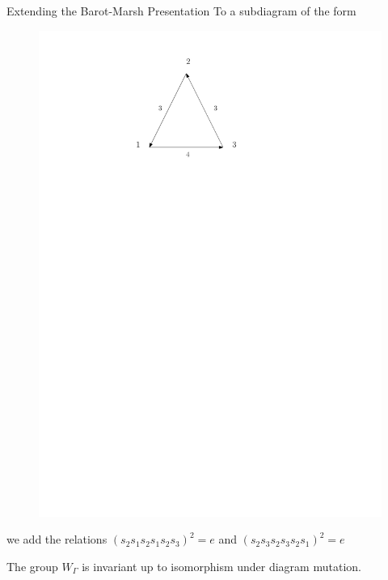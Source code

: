 \documentclass{beamer}
\begin{document}
\begin{frame}{Extending the Barot-Marsh Presentation}
To a subdiagram of the form
\begin{figure}
\includegraphics[scale = .50]{Diagram5.pdf}
\end{figure}
we add the relations $(s_{2}s_{1}s_{2}s_{1}s_{2}s_{3})^{2} = e$ and $(s_{2}s_{3}s_{2}s_{3}s_{2}s_{1})^{2} = e$
\end{frame}

\begin{frame}
\begin{theorem}
The group $W_{\Gamma}$ is invariant up to isomorphism under diagram mutation.
\end{theorem}
\end{frame}
\end{document}
